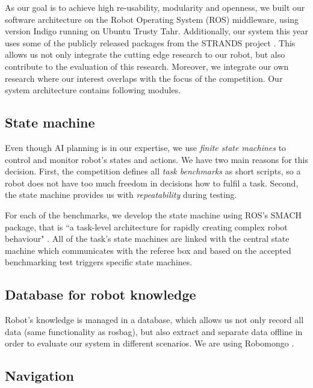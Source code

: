 As our goal is to achieve high re-usability, modularity and openness, we built our software architecture on the Robot Operating System (ROS) middleware, using version Indigo \cite{ros} running on Ubuntu Trusty Tahr. 
Additionally, our system this year uses some of the publicly released packages from the STRANDS project \cite{strands}. 
This allows us not only integrate the cutting edge research to our robot, but also contribute to the evaluation of this research. 
Moreover, we integrate our own research where our interest overlaps with the focus of the competition.
Our system architecture contains following modules.

\subsection{State machine}

Even though AI planning is in our expertise, we use \textit{finite state machines} to control and monitor robot's states and actions. 
We have two main reasons for this decision. First, the competition defines all \textit{task benchmarks} as short scripts, so a robot does not have too much freedom in decisions how to fulfil a task. Second, the state machine provides us with \textit{repeatability} during testing.

For each of the benchmarks, we develop the state machine using ROS's SMACH package, that is ``a task-level architecture for rapidly creating complex robot behaviour" \cite{smach}. 
All of the task's state machines are linked with the central state machine which communicates with the referee box and based on the accepted benchmarking test triggers specific state machines. 


\subsection{Database for robot knowledge}

Robot's knowledge is managed in a database, which allows us not only record all data (same functionality as rosbag), but also extract and separate data offline in order to evaluate our system in different scenarios. 
We are using Robomongo \cite{robomongo}.

\subsection{Navigation}

